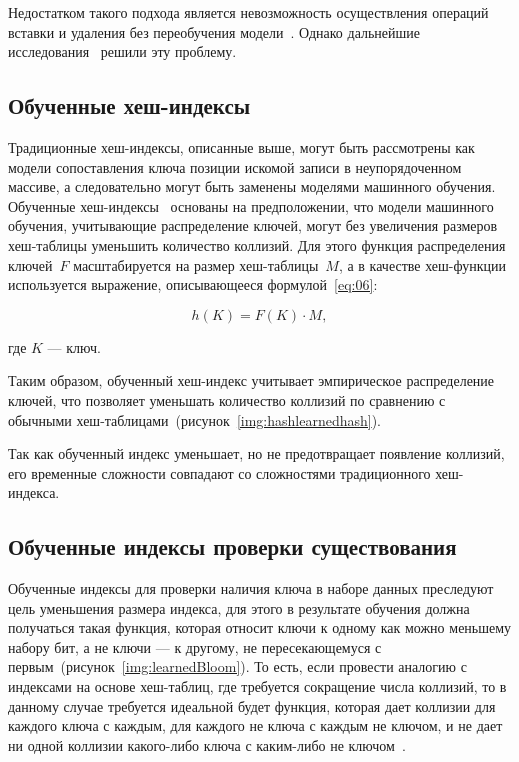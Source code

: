 Недостатком такого подхода является невозможность осуществления операций вставки
и удаления без переобучения модели~\cite{ulipp}. Однако дальнейшие
исследования~\cite{alex, apex, ulipp, pgmi} решили эту проблему.

\subsection{Обученные хеш-индексы}

Традиционные хеш-индексы, описанные выше, могут быть рассмотрены как модели
сопоставления ключа позиции искомой записи в неупорядоченном массиве, а
следовательно могут быть заменены моделями машинного обучения.  Обученные
хеш-индексы~\cite{main} основаны на предположении, что модели машинного
обучения, учитывающие распределение ключей, могут без увеличения размеров
хеш-таблицы уменьшить количество коллизий. Для этого функция распределения
ключей~$F$ масштабируется на размер хеш-таблицы~$M$, а в качестве хеш-функции
используется выражение, описывающееся формулой~\eqref{eq:06}:

\begin{equation}\label{eq:06}
    h(K) = F(K) \cdot M,
\end{equation}

где $K$ --- ключ.

Таким образом, обученный хеш-индекс учитывает эмпирическое распределение ключей,
что позволяет уменьшать количество коллизий по сравнению с обычными
хеш-таблицами~(рисунок~\ref{img:hashlearnedhash}).


Так как обученный индекс уменьшает, но не предотвращает появление коллизий, его
временные сложности совпадают со сложностями традиционного хеш-индекса.

\subsection{Обученные индексы проверки существования}

Обученные индексы для проверки наличия ключа в наборе данных преследуют цель
уменьшения размера индекса, для этого в результате обучения должна получаться
такая функция, которая относит ключи к одному как можно меньшему набору бит, а
не ключи --- к другому, не пересекающемуся с
первым~(рисунок~\ref{img:learnedBloom}). То
есть, если провести аналогию с индексами на основе хеш-таблиц, где требуется
сокращение числа коллизий, то в данному случае требуется идеальной будет
функция, которая дает коллизии для каждого ключа с каждым, для каждого не ключа
с каждым не ключом, и не дает ни одной коллизии какого-либо ключа с каким-либо
не ключом~\cite{main}.

